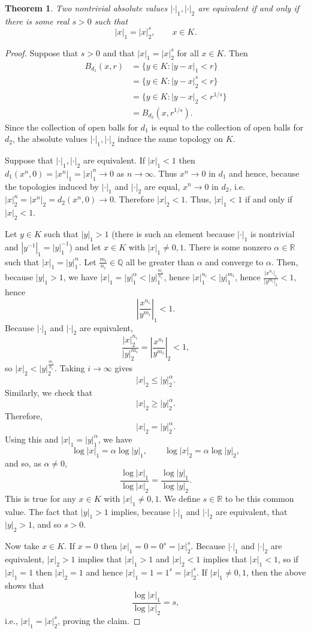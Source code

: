 \documentclass{article}
\newtheorem{theorem}{Theorem}
\theoremstyle{definition}
\begin{document}
\begin{theorem}
Two nontrivial absolute values $|\cdot|_1,|\cdot|_2$ are equivalent if and only if there is some  real $s>0$
such that
\[
|x|_1=|x|_2^s, \qquad x \in K.
\]
\label{equivalent}
\end{theorem}
\begin{proof}
Suppose that $s>0$ and that $|x|_1=|x|_2^s$ for all $x \in K$. Then
\begin{align*}
B_{d_1}(x,r) &= \{y \in K: |y-x|_1 < r\}\\
&=\{y \in K: |y-x|_2^s < r\}\\
&=\{y \in K: |y-x|_2 < r^{1/s}\}\\
&=B_{d_2}(x,r^{1/s}).
\end{align*}
Since the collection of open balls for $d_1$ is equal to the collection of open balls for $d_2$, the absolute values $|\cdot|_1,|\cdot|_2$ induce the same
topology on $K$. 

Suppose that $|\cdot|_1,|\cdot|_2$ are equivalent.
If $|x|_1<1$ then $d_1(x^n,0)=|x^n|_1= |x|_1^n   \to 0$ as $n \to \infty$. Thus $x^n \to 0$ in $d_1$ and
hence, because the topologies induced by $|\cdot|_1$ and $|\cdot|_2$ are equal,
$x^n \to 0$ in $d_2$, i.e. $|x|_2^n = |x^n|_2 = d_2(x^n,0) \to 0$. Therefore $|x|_2<1$. Thus, $|x|_1 < 1$ if and only if 
$|x|_2 < 1$. 

Let $y \in K$ such that $|y|_1>1$ (there is such an element because $|\cdot|_1$ is nontrivial and
 $|y^{-1}|_1 = |y|_1^{-1}$) and
let $x \in K$ with $|x|_1 \neq 0, 1$. There is some nonzero $\alpha \in \mathbb{R}$ such that $|x|_1=|y|_1^\alpha$. 
Let $\frac{m_i}{n_i} \in \mathbb{Q}$ all be greater than $\alpha$ and converge to $\alpha$. 
Then, because $|y|_1>1$,
we have $|x|_1 = |y|_1^\alpha < |y|_1^{\frac{m_i}{n_i}}$, hence
$|x|_1^{n_i} < |y|_1^{m_i}$, hence
$\frac{|x^{n_i}|_1}{ |y^{m_i}|_1}<1$, hence
\[
\left| \frac{x^{n_i}}{y^{m_i}} \right|_1 < 1.
\]
Because $|\cdot|_1$ and $|\cdot|_2$ are equivalent, 
\[
\frac{|x|_2^{n_i}}{|y|_2^{m_i}}
=
 \left| \frac{x^{n_i}}{y^{m_i}} \right|_2 < 1,
\]
so $|x|_2<|y|_2^{\frac{m_i}{n_i}}$. Taking $i \to \infty$ gives
\[
|x|_2 \leq |y|_2^\alpha.
\]
Similarly, we check that 
\[
|x|_2 \geq |y|_2^\alpha.
\]
Therefore,
\[
|x|_2 = |y|_2^\alpha.
\]
Using this and $|x|_1=|y|_1^\alpha$, we have
\[
\log |x|_1 = \alpha \log |y|_1, \qquad \log |x|_2 = \alpha \log |y|_2,
\]
and so, as $\alpha \neq 0$,
\[
\frac{\log |x|_1}{\log |x|_2} = \frac{\log |y|_1}{\log |y|_2}.
\]
This is true for any $x \in K$ with $|x|_1 \neq 0, 1$. We define $s \in \mathbb{R}$ to be this common value. The fact that
$|y|_1>1$ implies, because $|\cdot|_1$ and $|\cdot|_2$ are equivalent, that $|y|_2>1$, and so
$s>0$. 

Now take $x \in K$. If $x=0$ then $|x|_1=0=0^s=|x|_2^s$. Because $|\cdot|_1$ and $|\cdot|_2$ are equivalent, $|x|_2 >1$ implies that
$|x|_1>1$ and $|x|_2<1$ implies that $|x|_1<1$, so if $|x|_1=1$ then $|x|_2=1$ and hence
$|x|_1 =1=1^s= |x|_2^s$. If $|x|_1 \neq 0, 1$, then the above shows that
\[
\frac{\log |x|_1}{\log |x|_2} = s,
\]
i.e., $|x|_1 = |x|_2^s$, proving the claim.
\end{proof}
\end{document}
